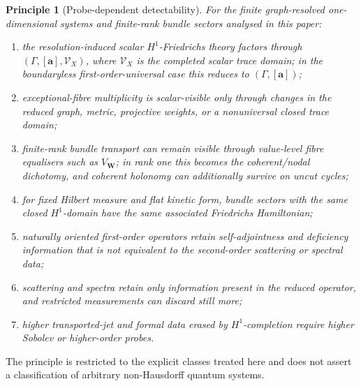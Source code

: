 \documentclass[11pt]{article}
\theoremstyle{plain}
\newtheorem{principle}[theorem]{Principle}
\theoremstyle{definition}
\begin{document}
\begin{principle}[Probe-dependent detectability]
\label{thm:quantum-detectability}
For the finite graph-resolved one-dimensional systems and finite-rank bundle
sectors analysed in this paper:

\begin{enumerate}[label=(\roman*),leftmargin=2.2em]

  \item the resolution-induced scalar \(H^1\)-Friedrichs theory factors
        through \((\Gamma,[\mathbf a],\mathcal V_X)\), where
        \(\mathcal V_X\) is the completed scalar trace domain; in the
        boundaryless first-order-universal case this reduces to
        \((\Gamma,[\mathbf a])\);

  \item exceptional-fibre multiplicity is scalar-visible only through
        changes in the reduced graph, metric, projective weights, or a
        nonuniversal closed trace domain;

  \item finite-rank bundle transport can remain visible through value-level
        fibre equalisers such as \(V_{\mathbf W}\); in rank one this becomes
        the coherent/nodal dichotomy, and coherent holonomy can additionally
        survive on uncut cycles;

  \item for fixed Hilbert measure and flat kinetic form, bundle sectors with
        the same closed \(H^1\)-domain have the same associated Friedrichs
        Hamiltonian;

  \item naturally oriented first-order operators retain self-adjointness
        and deficiency information that is not equivalent to the
        second-order scattering or spectral data;

  \item scattering and spectra retain only information present in the
        reduced operator, and restricted measurements can discard still
        more;

  \item higher transported-jet and formal data erased by \(H^1\)-completion
        require higher Sobolev or higher-order probes.

\end{enumerate}
\end{principle}

The principle is restricted to the explicit classes treated here and does not assert a classification of arbitrary non-Hausdorff quantum systems.
\end{document}

